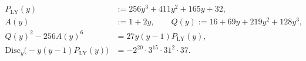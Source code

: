 \begin{equation}\label{eq:fold_zm_leyang_discriminant_ridge_difference_square_audit}
\begin{aligned}
P_{\mathrm{LY}}(y)&:=256y^{3}+411y^{2}+165y+32,\\
A(y)&:=1+2y,\qquad Q(y):=16+69y+219y^{2}+128y^{3},\\
Q(y)^{2}-256A(y)^{6}&=27y(y-1)P_{\mathrm{LY}}(y),\\
\mathrm{Disc}_{y}\!\bigl(-y(y-1)P_{\mathrm{LY}}(y)\bigr)&=-2^{20}\cdot 3^{15}\cdot 31^{2}\cdot 37.
\end{aligned}
\end{equation}
